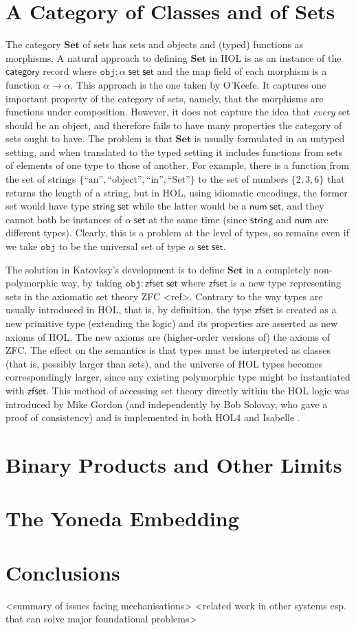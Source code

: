\documentclass[twoside,titlepage,11pt]{article}
\begin{document}
\section{A Category of Classes and of Sets}%
\newcommand{\Set}{\ensuremath{\mathbf{Set}}}
The category $\Set$ of sets has sets and objects and (typed) functions as morphisms.
A natural approach to defining $\Set$ in HOL is as an instance of the $\mathsf{category}$ record where $\mathtt{obj}:\alpha\;\mathsf{set}\;\mathsf{set}$ and the map field of each morphism is a function $\alpha\to\alpha$.
This approach is the one taken by O'Keefe.
It captures one important property of the category of sets, namely, that the morphisms are functions under composition.
However, it does not capture the idea that \emph{every} set should be an object, and therefore fails to have many properties the category of sets ought to have.
The problem is that $\Set$ is usually formulated in an untyped setting, and when translated to the typed setting it includes functions from sets of elements of one type to those of another.
For example, there is a function from the set of strings $\{\text{``an''},\text{``object''},\text{``in''},\text{``Set''}\}$ to the set of numbers $\{2,3,6\}$ that returns the length of a string, but in HOL, using idiomatic encodings, the former set would have type $\mathsf{string}\;\mathsf{set}$ while the latter would be a $\mathsf{num}\;\mathsf{set}$, and they cannot both be instances of $\alpha\;\mathsf{set}$ at the same time (since $\mathsf{string}$ and $\mathsf{num}$ are different types).
Clearly, this is a problem at the level of types, so remains even if we take $\mathtt{obj}$ to be the universal set of type $\alpha\;\mathsf{set}\;\mathsf{set}$.

The solution in Katovksy's development is to define $\Set$ in a completely non-polymorphic way, by taking $\mathtt{obj}:\mathsf{zfset}\;\mathsf{set}$ where $\mathsf{zfset}$ is a new type representing sets in the axiomatic set theory ZFC <ref>.
Contrary to the way types are usually introduced in HOL, that is, by definition, the type $\mathsf{zfset}$ is created as a new primitive type (extending the logic) and its properties are asserted as new axioms of HOL.
The new axioms are (higher-order versions of) the axioms of ZFC.
The effect on the semantics is that types must be interpreted as classes (that is, possibly larger than sets), and the universe of HOL types becomes correspondingly larger, since any existing polymorphic type might be instantiated with $\mathsf{zfset}$.
This method of accessing set theory directly within the HOL logic was introduced by Mike Gordon \cite{DBLP:conf/tphol/Gordon96} (and independently by Bob Solovay, who gave a proof of consistency) and is implemented in both HOL4 and Isabelle \cite{DBLP:conf/ictac/Obua06}.
\section{Binary Products and Other Limits}%
\section{The Yoneda Embedding}%
\section{Conclusions}%
<summary of issues facing mechanisations>
<related work in other systems esp. that can solve major foundational problems>


\end{document}
